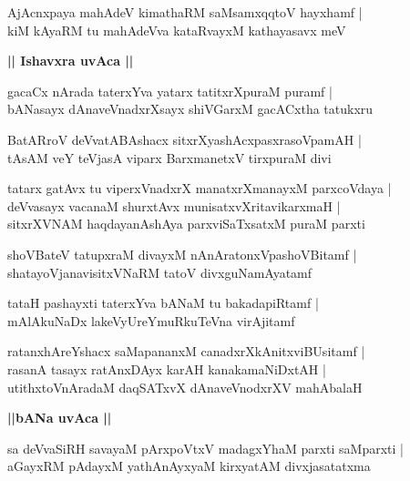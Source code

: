 \documentclass[twoside,12pt,openright]{book}
\newcounter{shloka}[chapter]
\def\uvaca#1{\centerline{{\large\textbf{#1}}}}
\begin{document}
\begin{shloka}
AjAcnxpaya mahAdeV kimathaRM saMsamxqqtoV hayxhamf |\\
kiM kAyaRM tu mahAdeVva kataRvayxM kathayasavx meV 
\end{shloka}

\uvaca{|| Ishavxra uvAca ||}

\begin{shloka}
gacaCx nArada taterxYva yatarx tatitxrXpuraM puramf |\\
bANasayx dAnaveVnadxrXsayx shiVGarxM gacACxtha tatukxru 
\end{shloka}

\begin{shloka}
BatARroV deVvatABAshacx sitxrXyashAcxpasxrasoVpamAH |\\
tAsAM veY teVjasA viparx BarxmanetxV tirxpuraM divi
\end{shloka}

\begin{shloka}
tatarx gatAvx tu viperxVnadxrX manatxrXmanayxM parxcoVdaya |\\
deVvasayx vacanaM shurxtAvx munisatxvXritavikarxmaH |\\
sitxrXVNAM haqdayanAshAya parxviSaTxsatxM puraM parxti
\end{shloka}


\begin{shloka}
shoVBateV tatupxraM divayxM nAnAratonxVpashoVBitamf |\\
shatayoVjanavisitxVNaRM tatoV divxguNamAyatamf 
\end{shloka}

\begin{shloka}
tataH pashayxti taterxYva bANaM tu bakadapiRtamf |\\
mAlAkuNaDx lakeVyUreYmuRkuTeVna virAjitamf 
\end{shloka}

\begin{shloka}
ratanxhAreYshacx saMapananxM canadxrXkAnitxviBUsitamf |\\
rasanA tasayx ratAnxDAyx karAH kanakamaNiDxtAH |\\
utithxtoVnAradaM daqSATxvX dAnaveVnodxrXV mahAbalaH 
\end{shloka}

\uvaca{||bANa uvAca ||}

\begin{shloka}
sa deVvaSiRH savayaM pArxpoVtxV madagxYhaM parxti saMparxti |\\
aGayxRM pAdayxM yathAnAyxyaM kirxyatAM divxjasatatxma
\end{shloka}
\end{document}
